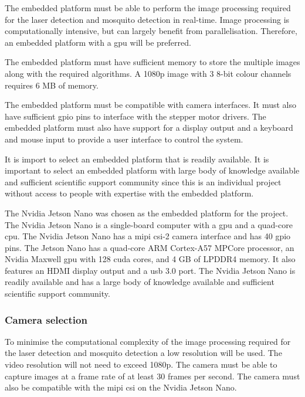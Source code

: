 \begin{description}[style=nextline]
    \item[Processing power] The embedded platform must be able to perform the image processing required for the laser detection and mosquito detection in real-time. Image processing is computationally intensive, but can largely benefit from parallelisation. Therefore, an embedded platform with a \gls{gpu} will be preferred.
    \item[Memory] The embedded platform must have sufficient memory to store the multiple images along with the required algorithms. A 1080p image with 3 8-bit colour channels requires 6 MB of memory.
    \item[Hardware interfaces] The embedded platform must be compatible with camera interfaces. It must also have sufficient \gls{gpio} pins to interface with the stepper motor drivers. The embedded platform must also have support for a display output and a keyboard and mouse input to provide a user interface to control the system.
    \item[Availability and support] It is import to select an embedded platform that is readily available. It is important to select an embedded platform with large body of knowledge available and sufficient scientific support community since this is an individual project without access to people with expertise with the embedded platform.
\end{description}

The Nvidia Jetson Nano was chosen as the embedded platform for the project. The Nvidia Jetson Nano is a single-board computer with a \gls{gpu} and a quad-core \gls{cpu}. The Nvidia Jetson Nano has a \gls{mipi} \gls{csi}-2 camera interface and has 40 \gls{gpio} pins. The Jetson Nano has a quad-core ARM Cortex-A57 MPCore processor, an Nvidia Maxwell \gls{gpu} with 128 \gls{cuda} cores, and 4 GB of LPDDR4 memory. It also features an HDMI display output and a \gls{usb} 3.0 port. The Nvidia Jetson Nano is readily available and has a large body of knowledge available and sufficient scientific support community.



\subsubsection{Camera selection}
To minimise the computational complexity of the image processing required for the laser detection and mosquito detection a low resolution will be used. The video resolution will not need to exceed 1080p. The camera must be able to capture images at a frame rate of at least 30 frames per second. The camera must also be compatible with the \gls{mipi} \gls{csi} on the Nvidia Jetson Nano.

